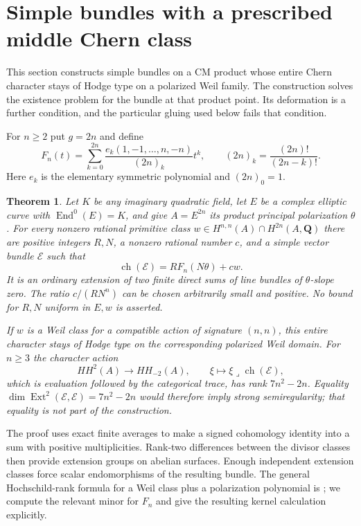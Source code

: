 \documentclass[11pt]{article}
\newtheorem{theorem}{Theorem}[section]
\theoremstyle{definition}
\theoremstyle{remark}
\begin{document}
\section{Simple bundles with a prescribed middle Chern class}
\label{sec:simple-hodge-bundles}

This section constructs simple bundles on a CM product whose entire
Chern character stays of Hodge type on a polarized Weil family.
The construction solves the existence problem for the bundle at that
product point.  Its deformation is a further condition, and the
particular gluing used below fails that condition.

For $n\ge2$ put $g=2n$ and define
\begin{equation}
 F_n(t)=\sum_{k=0}^{2n}
  \frac{e_k(1,-1,\ldots,n,-n)}{(2n)_k}t^k,
 \qquad (2n)_k=\frac{(2n)!}{(2n-k)!}.
 \label{eq:positive-character-polynomial}
\end{equation}
Here $e_k$ is the elementary symmetric polynomial and $(2n)_0=1$.

\begin{theorem}\label{thm:simple-hodge-bundle}
Let $K$ be any imaginary quadratic field, let $E$ be a complex
elliptic curve with $\operatorname{End}^0(E)=K$, and give
$A=E^{2n}$ its product principal polarization $\theta$.
For every nonzero rational primitive class
$w\in H^{n,n}(A)\cap H^{2n}(A,\mathbf Q)$ there are positive integers
$R,N$, a nonzero rational number $c$, and a simple vector bundle
$\mathcal E$ such that
\[
 \operatorname{ch}(\mathcal E)=R F_n(N\theta)+cw.
\]
It is an ordinary extension of two finite direct sums of line
bundles of $\theta$-slope zero.  The ratio $c/(RN^n)$ can be chosen
arbitrarily small and positive.  No bound for $R,N$ uniform in
$E,w$ is asserted.

If $w$ is a Weil class for a compatible action of signature $(n,n)$,
this entire character stays of Hodge type on the corresponding
polarized Weil domain.  For $n\ge3$ the character action
\[
 HH^2(A)\longrightarrow HH_{-2}(A),\qquad
 \xi\longmapsto\xi\mathbin{\lrcorner}\operatorname{ch}(\mathcal E),
\]
which is evaluation followed by the categorical trace, has rank
$7n^2-2n$.  Equality
$\dim\operatorname{Ext}^2(\mathcal E,\mathcal E)=7n^2-2n$ would
therefore imply strong semiregularity; that equality is not part
of the construction.
\end{theorem}

The proof uses exact finite averages to make a signed cohomology
identity into a sum with positive multiplicities.  Rank-two
differences between the divisor classes then provide extension
groups on abelian surfaces.  Enough independent extension classes
force scalar endomorphisms of the resulting bundle.
The general Hochschild-rank formula for a Weil class plus a
polarization polynomial is
\cite[Theorem~A6]{BBK3Sixfolds}; we compute the relevant minor for
$F_n$ and give the resulting kernel calculation explicitly.
\end{document}
